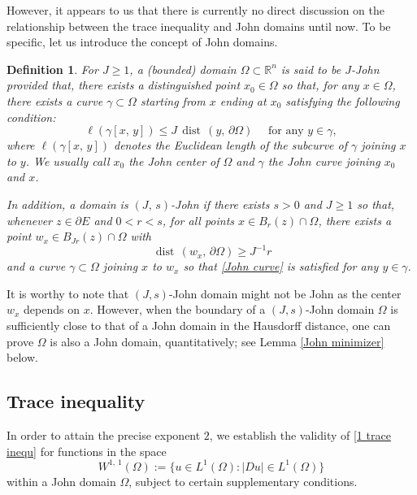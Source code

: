 \documentclass[reqno,11pt]{amsart}
\makeatletter
\def\dist{{\mathop\mathrm{\,dist\,}}}
\newtheorem{defn}[thm]{Definition}%
\numberwithin{equation}{section}
\theoremstyle{remark}
\makeatother
\begin{document}
However, it appears to us that there is currently no direct discussion on the relationship between the trace inequality and John domains until now.
To be specific, let us introduce  the concept of John domains.
\begin{defn}
    For $J\ge 1$, a (bounded) domain $\Omega\subset \mathbb R^n$ is said to be  $J$-John  provided that, there exists a distinguished point $x_0\in \Omega$ so that, for any $x\in \Omega$, there exists a curve $\gamma\subset \Omega$ starting from $x$ ending at $x_0$ satisfying the following condition: 
\begin{equation}\label{John curve}
\ell(\gamma[x,\,y])\le J\dist(y,\,\partial \Omega) \quad \text{ for any $y\in \gamma$}, 
\end{equation}
where $\ell(\gamma[x,\,y])$ denotes the Euclidean length of the subcurve of $\gamma$ joining $x$ to $y$. 
We usually call $x_0$ the  {John center} of $\Omega$ and $\gamma$ the  {John curve} joining $x_0$ and $x$. 

In addition, a domain is $(J,\,s)$-John if there exists $s>0$ and $J\ge 1$ so that, whenever $z\in \partial E$ and $0<r<s$, for all points $x\in B_r(z)\cap \Omega$, there exists a point $w_x\in B_{Jr}(z)\cap \Omega$ with 
$$\dist(w_x,\,\partial \Omega)\ge J^{-1}r$$
and a curve $\gamma\subset \Omega$ joining $x$ to $w_x$ so that \eqref{John curve} is satisfied for any $y\in \gamma$.
\end{defn}

 It is worthy to note that $(J,s)$-John domain might not be John as the center $w_x$ depends on $x$. However, when the boundary of a $(J,s)$-John domain $\Omega$ is sufficiently close to that of a John domain in the Hausdorff distance, one can prove $\Omega$ is also a John domain, quantitatively; see Lemma \ref{John minimizer} below.
 
  

\subsection{Trace inequality} 



In order to attain the precise exponent  $2$, we establish the validity of \eqref{1 trace inequ} for functions in the space 
$$ W^{1,\,1}(\Omega):=\{u\in L^1(\Omega): |D u|\in L^1(\Omega)\}$$
within a John domain $\Omega$, subject to certain supplementary conditions.  
\end{document}
